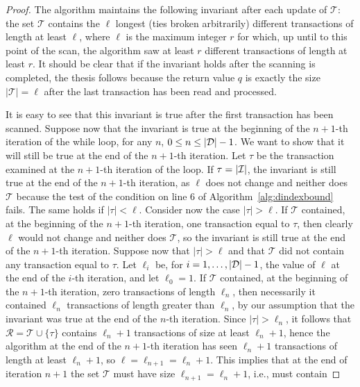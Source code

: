 \begin{proof}
  The algorithm maintains the following invariant after each update of
  $\mathcal{T}$: the set $\mathcal{T}$ contains the $\ell$ longest (ties broken
  arbitrarily) different transactions of length at least $\ell$, where $\ell$ is
  the maximum integer $r$ for which, up until to this point of the scan, the
  algorithm saw at least $r$ different transactions of length at least $r$. It
  should be clear that if the invariant holds after the scanning is completed,
  the thesis follows because the return value $q$ is exactly the size
  $|\mathcal{T}|=\ell$ after the last transaction has been read and processed.
  
  It is easy to see that this invariant is true after the first transaction has
  been scanned. Suppose now that the invariant is true at the beginning of the $n+1$-th
  iteration of the while loop, for any $n$, $0\le n\le |{\cal D}|-1$. 
  We want to show that it will still be true at the end of the $n+1$-th
  iteration. Let $\tau$ be the transaction examined at the $n+1$-th iteration of
  the loop. If $\tau=|{\cal I}|$, the invariant is still true at the end of the $n+1$-th
  iteration, as $\ell$ does not change and neither does $\mathcal{T}$ because
  the test of the condition on line 6 of Algorithm~\ref{alg:dindexbound} fails.
  The same holds if $|\tau|<\ell$. Consider now
  the case $|\tau|>\ell$. If $\mathcal{T}$ contained, at the beginning of the
  $n+1$-th iteration, one transaction equal to $\tau$, then clearly $\ell$ would not
  change and neither does $\mathcal{T}$, so the invariant is still true at the
  end of the $n+1$-th iteration. Suppose
  now that $|\tau|>\ell$ and that $\mathcal{T}$ did not contain any transaction
  equal to $\tau$. Let $\ell_i$ be, for $i=1,\dotsc,|{\cal D}|-1$, the value
  of $\ell$ at the end of the $i$-th iteration, and let $\ell_0=1$. If
  $\mathcal{T}$ contained, at the beginning of the $n+1$-th iteration, zero
  transactions of length $\ell_n$, then necessarily it contained $\ell_n$
  transactions of length greater than
  $\ell_n$, by our assumption that the invariant was true at the end of the
  $n$-th iteration. Since $|\tau|>\ell_n$, it follows that
  $\mathcal{R}=\mathcal{T}\cup\{\tau\}$ contains $\ell_n+1$ transactions of size
  at least $\ell_n+1$, hence the algorithm at the end of the $n+1$-th iteration has
  seen $\ell_n+1$ transactions of length at least $\ell_n+1$, so
  $\ell=\ell_{n+1}=\ell_n+1$. This implies that at the end of iteration $n+1$
  the set $\mathcal{T}$ must have size $\ell_{n+1}=\ell_n+1$, i.e., must contain

\end{proof}
